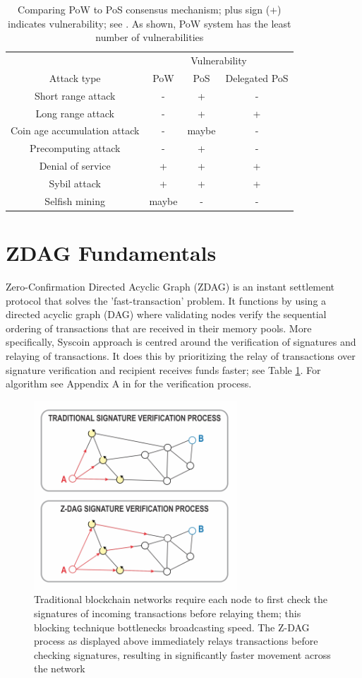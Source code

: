 \documentclass[peerreview]{ieeesyscoin}
\begin{document}
\begin{table}[h!]
\centering
\begin{tabular}{ |c|c|c|c| } 
\hline
 & \multicolumn{3}{|c|}{ Vulnerability } \\
 Attack type & PoW & PoS & Delegated PoS \\
\hline
Short range attack & - & + & - \\
Long range attack & - & + & + \\
Coin age accumulation attack & - & maybe & - \\
Precomputing attack & - & + & - \\
Denial of service & + & + & + \\
Sybil attack & + & + & + \\
Selfish mining & maybe & - & - \\
\hline
\end{tabular}
\caption{Comparing PoW to PoS consensus mechanism; plus sign (+) indicates vulnerability; see \cite{Bit15}. As shown, PoW system has the least number of vulnerabilities}
\label{table:pow_vs_pos}
\end{table}

\section{ZDAG Fundamentals}

Zero-Confirmation Directed Acyclic Graph (ZDAG) is an instant settlement protocol that solves the 'fast-transaction' problem. It functions by using a directed acyclic graph (DAG) where validating nodes verify the sequential ordering of transactions that are received in their memory pools. More specifically, Syscoin approach is centred around the verification of signatures and relaying of transactions. It does this by prioritizing the relay of transactions over signature verification and recipient receives funds faster; see Table \ref{fig:dag_tx}. For algorithm see Appendix A in \cite{Sidb18} for the verification process.

\begin{figure}[h!]
\includegraphics[width=3in]{img/dag_tx.png}
\caption{Traditional blockchain networks require each node to first check the signatures of incoming transactions before relaying them; this blocking technique bottlenecks broadcasting speed. The Z-DAG process as displayed above immediately relays transactions before checking signatures, resulting in significantly faster movement across the network} 
\label{fig:dag_tx}
\end{figure} 
\end{document}
